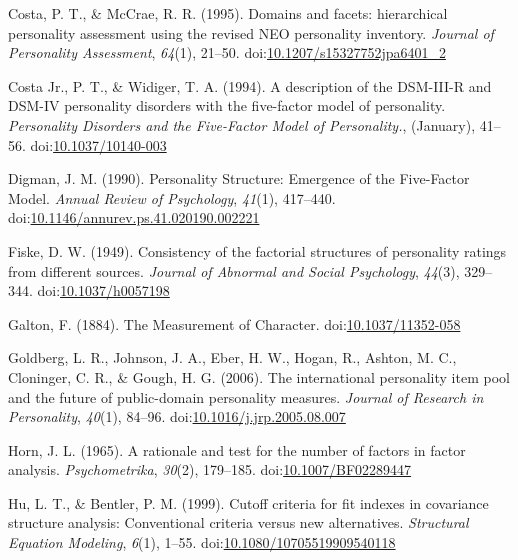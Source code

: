 \documentclass[man]{apa6}
\theoremstyle{definition}
\theoremstyle{definition}
\theoremstyle{definition}
\theoremstyle{remark}
\begin{document}
\leavevmode\hypertarget{ref-Costa1995}{}%
Costa, P. T., \& McCrae, R. R. (1995). Domains and facets: hierarchical
personality assessment using the revised NEO personality inventory.
\emph{Journal of Personality Assessment}, \emph{64}(1), 21--50.
doi:\href{https://doi.org/10.1207/s15327752jpa6401_2}{10.1207/s15327752jpa6401\_2}

\leavevmode\hypertarget{ref-Widiger1994}{}%
Costa Jr., P. T., \& Widiger, T. A. (1994). A description of the
DSM-III-R and DSM-IV personality disorders with the five-factor model of
personality. \emph{Personality Disorders and the Five-Factor Model of
Personality.}, (January), 41--56.
doi:\href{https://doi.org/10.1037/10140-003}{10.1037/10140-003}

\leavevmode\hypertarget{ref-Digman1990}{}%
Digman, J. M. (1990). Personality Structure: Emergence of the
Five-Factor Model. \emph{Annual Review of Psychology}, \emph{41}(1),
417--440.
doi:\href{https://doi.org/10.1146/annurev.ps.41.020190.002221}{10.1146/annurev.ps.41.020190.002221}

\leavevmode\hypertarget{ref-Fiske1949}{}%
Fiske, D. W. (1949). Consistency of the factorial structures of
personality ratings from different sources. \emph{Journal of Abnormal
and Social Psychology}, \emph{44}(3), 329--344.
doi:\href{https://doi.org/10.1037/h0057198}{10.1037/h0057198}

\leavevmode\hypertarget{ref-Galton1884}{}%
Galton, F. (1884). The Measurement of Character.
doi:\href{https://doi.org/10.1037/11352-058}{10.1037/11352-058}

\leavevmode\hypertarget{ref-Goldberg2006}{}%
Goldberg, L. R., Johnson, J. A., Eber, H. W., Hogan, R., Ashton, M. C.,
Cloninger, C. R., \& Gough, H. G. (2006). The international personality
item pool and the future of public-domain personality measures.
\emph{Journal of Research in Personality}, \emph{40}(1), 84--96.
doi:\href{https://doi.org/10.1016/j.jrp.2005.08.007}{10.1016/j.jrp.2005.08.007}

\leavevmode\hypertarget{ref-Horn1965}{}%
Horn, J. L. (1965). A rationale and test for the number of factors in
factor analysis. \emph{Psychometrika}, \emph{30}(2), 179--185.
doi:\href{https://doi.org/10.1007/BF02289447}{10.1007/BF02289447}

\leavevmode\hypertarget{ref-Hu1999}{}%
Hu, L. T., \& Bentler, P. M. (1999). Cutoff criteria for fit indexes in
covariance structure analysis: Conventional criteria versus new
alternatives. \emph{Structural Equation Modeling}, \emph{6}(1), 1--55.
doi:\href{https://doi.org/10.1080/10705519909540118}{10.1080/10705519909540118}
\end{document}
